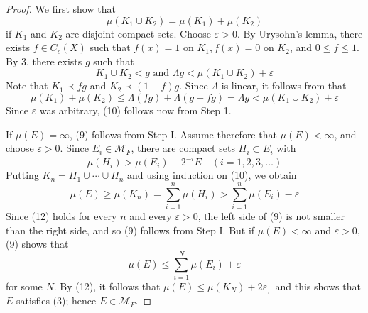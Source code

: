 \documentclass[12pt, a4paper, oneside]{book}
\begin{document}
\begin{theorem}
\begin{proof}
        We first show that
        \begin{equation*}
            \mu\left(K_1 \cup K_2\right)=\mu\left(K_1\right)+\mu\left(K_2\right)
        \end{equation*}
        if $K_1$ and $K_2$ are disjoint compact sets. Choose $\varepsilon>0$. By Urysohn's lemma, there exists $f \in C_c(X)$ such that $f(x)=1$ on $K_1, f(x)=0$ on $K_2$, and $0 \leq f \leq 1$. By 3. there exists $g$ such that
        \begin{equation*}
            K_1 \cup K_2<g \text { and } \Lambda g<\mu\left(K_1 \cup K_2\right)+\varepsilon
        \end{equation*}
        Note that $K_1 \prec f g$ and $K_2 \prec (1-f) g$. Since $\Lambda$ is linear, it follows from  that
        \begin{equation*}
            \mu\left(K_1\right)+\mu\left(K_2\right) \leq \Lambda(f g)+\Lambda(g-f g)=\Lambda g<\mu\left(K_1 \cup K_2\right)+\varepsilon
        \end{equation*}
        Since $\varepsilon$ was arbitrary, (10) follows now from Step 1.

        If $\mu(E)=\infty$, (9) follows from Step I. Assume therefore that $\mu(E)<\infty$, and choose $\varepsilon>0$. Since $E_i \in \mathcal{M}_F$, there are compact sets $H_i \subset E_i$ with
        \begin{equation*}
            \mu\left(H_i\right)>\mu\left(E_i\right)-2^{-i} E \quad(i=1,2,3, \ldots)
        \end{equation*}
        Putting $K_n=H_1 \cup \cdots \cup H_n$ and using induction on (10), we obtain
        \begin{equation*}
            \mu(E) \geq \mu\left(K_n\right)=\sum_{i=1}^n \mu\left(H_i\right)>\sum_{i=1}^n \mu\left(E_i\right)-\varepsilon
        \end{equation*}
        Since (12) holds for every $n$ and every $\varepsilon>0$, the left side of (9) is not smaller than the right side, and so (9) follows from Step I.
        But if $\mu(E)<\infty$ and $\varepsilon>0$, (9) shows that
        \begin{equation*}
            \mu(E) \leq \sum_{i=1}^N \mu\left(E_i\right)+\varepsilon
        \end{equation*}
        for some $N$. By (12), it follows that $\mu(E) \leq \mu\left(K_N\right)+2 \varepsilon_{\text {, }}$ and this shows that $E$ satisfies (3); hence $E \in \mathcal{M}_F$.



\end{proof}
\end{theorem}
\end{document}
